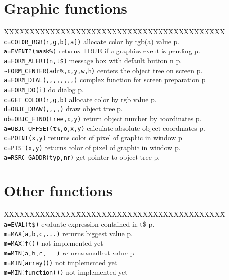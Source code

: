 \section{Graphic functions}
\begin{tabbing}
XXXXXXXXXXXXXXX\=XXXXXXXXXXXXXXXXXXXXXXXXXXXX\=\kill\\
\verb|c=COLOR_RGB(r,g,b[,a])| \> allocate color by rgb(a) value\> p.\pageref{COLORiRGB}\\
\verb|a=EVENT?(mask%)| \> returns TRUE if a graphics event is pending \> p.\pageref{EVENTf}\\
\verb|a=FORM_ALERT(n,t$)| \>	 message box with default button n\> p.\pageref{FORMiALERT}\\
\verb|~FORM_CENTER(adr%,x,y,w,h)| \>centers the object tree on screen \> p.\pageref{FORMiCENTER}\\
\verb|a=FORM_DIAL(,,,,,,,,)|   \> complex function for screen preparation\> p.\pageref{FORMiDIAL}\\
\verb|a=FORM_DO(i)|            \> do dialog\> p.\pageref{FORMiDO}\\
\verb|c=GET_COLOR(r,g,b)|      \> allocate color by rgb value\> p.\pageref{GETiCOLOR}\\
\verb|d=OBJC_DRAW(,,,,)|       \> draw object tree\> p.\pageref{OBJCiDRAW}\\
\verb|ob=OBJC_FIND(tree,x,y)|  \> return object number by coordinates\> p.\pageref{OBJCiFIND}\\
\verb|a=OBJC_OFFSET(t%,o,x,y)| \> calculate absolute object coordinates\> p.\pageref{OBJCiOFFSET}\\
\verb|c=POINT(x,y)|            \> returns color of pixel of graphic in window\> p.\pageref{POINT}\\
\verb|c=PTST(x,y)|             \> returns color of pixel of graphic in window\> p.\pageref{PTST}\\
\verb|a=RSRC_GADDR(typ,nr)|    \> get pointer to object tree\> p.\pageref{RSRCiGADDR}\\
\end{tabbing}

\section{Other functions}
\begin{tabbing}
XXXXXXXXXXXXXX\=XXXXXXXXXXXXXXXXXXXXXXXXXXXXX\=\kill\\
\verb|a=EVAL(t$)|        \> evaluate expression contained in t\$\> p.\pageref{EVAL}\\
\verb|m=MAX(a,b,c,...)|  \> returns biggest value               \> p.\pageref{MAX}\\
\verb|m=MAX(f())| 	 \> not implemented yet\\
\verb|m=MIN(a,b,c,...)|  \>  returns smallest value             \> p.\pageref{MIN}\\
\verb|m=MIN(array())|    \> not implemented yet\\
\verb|m=MIN(function())| \> not implemented yet\\
\end{tabbing}


